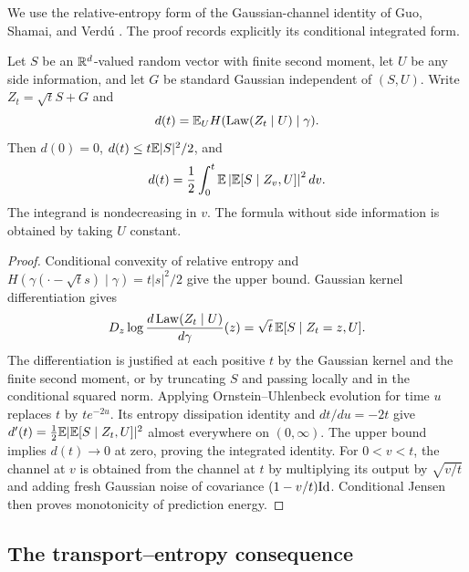 We use the relative-entropy form of the Gaussian-channel identity of
Guo, Shamai, and Verd\'u \cite[Theorem~5, Equation~(66)]{GuoShamaiVerdu2005}.
The proof records explicitly its conditional integrated form.

\begin{lemma}\label{lem:gaussian-signals}
Let $S$ be an $\mathbb R^d$-valued random vector with finite second
moment, let $U$ be any side information, and let $G$ be standard
Gaussian independent of $(S,U)$. Write $Z_t=\sqrt tS+G$ and
\[
 d(t)=\mathbb E_U H(\operatorname{Law}(Z_t\mid U)\mid\gamma).
\]
Then $d(0)=0$, $d(t)\le t\mathbb E|S|^2/2$, and
\begin{equation}\label{eq:calculus-gaussian-signal}
 d(t)=\frac12\int_0^t
 \mathbb E\left|\mathbb E[S\mid Z_v,U]\right|^2dv.
\end{equation}
The integrand is nondecreasing in $v$. The formula without side
information is obtained by taking $U$ constant.
\end{lemma}

\begin{proof}
Conditional convexity of relative entropy and
$H(\gamma(\cdot-\sqrt t s)\mid\gamma)=t|s|^2/2$
give the upper bound. Gaussian kernel differentiation gives
\[
 D_z\log\frac{d\operatorname{Law}(Z_t\mid U)}{d\gamma}(z)
 =\sqrt t\,\mathbb E[S\mid Z_t=z,U].
\]
The differentiation is justified at each positive $t$ by the
Gaussian kernel and the finite second moment, or by truncating
$S$ and passing locally and in the conditional squared norm.
Applying Ornstein--Uhlenbeck evolution for time $u$ replaces $t$
by $te^{-2u}$. Its entropy dissipation identity and
$dt/du=-2t$ give $d'(t)=\frac12\mathbb E|\mathbb E[S\mid Z_t,U]|^2$
almost everywhere on $(0,\infty)$. The upper bound implies
$d(t)\to0$ at zero, proving the integrated identity. For
$0<v<t$, the channel at $v$ is obtained from the channel at $t$
by multiplying its output by $\sqrt{v/t}$ and adding fresh
Gaussian noise of covariance $(1-v/t)\mathrm{Id}$. Conditional Jensen
then proves monotonicity of prediction energy.
\end{proof}

\subsection{The transport--entropy consequence}
\label{sec:transport-consequence}

